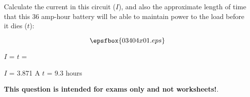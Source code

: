 

Calculate the current in this circuit ($I$), and also the approximate length of time that this 36 amp-hour battery will be able to maintain power to the load before it dies ($t$):

$$\epsfbox{03404x01.eps}$$

$I$ = \hskip 150pt $t$ = 







$I$ = 3.871 A \hskip 100pt $t$ = 9.3 hours







{\bf This question is intended for exams only and not worksheets!}.



